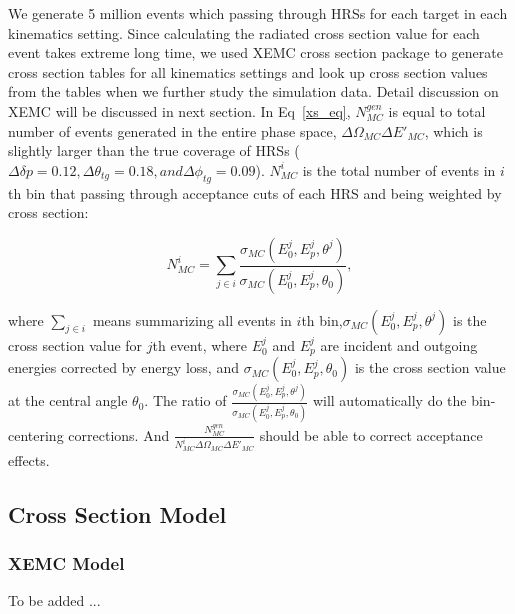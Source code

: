 We generate 5 million events which passing through HRSs for each target in each kinematics setting. Since calculating the radiated cross section value for each event takes extreme long time, we used XEMC cross section package to generate cross section tables for all kinematics settings and look up cross section values from the tables when we further study the simulation data. Detail discussion on XEMC will be discussed in next section. In Eq~\eqref{xs_eq}, $N_{MC}^{gen}$ is equal to total number of events generated in the entire phase space, $\Delta\Omega_{MC}\Delta E'_{MC}$, which is slightly larger than the true coverage of HRSs ($\Delta\delta p=0.12, \Delta\theta_{tg}=0.18, and \Delta\phi_{tg}=0.09$). $N_{MC}^{i}$ is the total number of events in $i$th bin that passing through acceptance cuts of each HRS and being weighted by cross section:

\begin{equation}
  N_{MC}^{i} = \sum_{j\in i} \frac{\sigma_{MC}(E_{0}^{j},E_{p}^{j},\theta^{j})}{\sigma_{MC}(E_{0}^{j},E_{p}^{j},\theta_{0})},
\end{equation}

where $\sum_{j\in i}$ means summarizing all events in $i$th bin,$\sigma_{MC}(E_{0}^{j},E_{p}^{j},\theta^{j})$ is the cross section value for $j$th event, where $E_{0}^{j}$ and $E_{p}^{j}$ are incident and outgoing energies corrected by energy loss, and $\sigma_{MC}(E_{0}^{j},E_{p}^{j},\theta_{0})$ is the cross section value at the central angle $\theta_{0}$. The ratio of $\frac{\sigma_{MC}(E_{0}^{j},E_{p}^{j},\theta^{j})}{\sigma_{MC}(E_{0}^{j},E_{p}^{j},\theta_{0})}$ will automatically do the bin-centering corrections. And $\frac{N_{MC}^{gen}}{N_{MC}^{i} \Delta\Omega_{MC} \Delta E'_{MC}}$ should be able to correct acceptance effects.


\subsection{Cross Section Model}

\subsubsection{XEMC Model} 
 To be added ...

